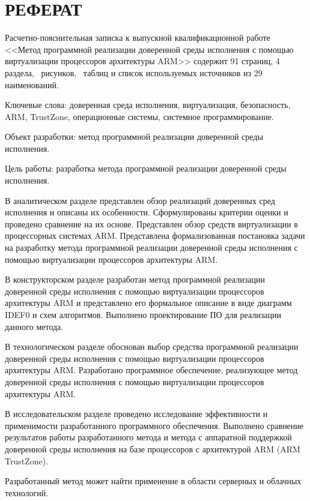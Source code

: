 \section*{РЕФЕРАТ}

Расчетно-пояснительная записка к выпускной квалификационной работе <<Метод программной реализации доверенной среды исполнения с помощью виртуализации процессоров архитектуры ARM>> содержит 91 страниц, 4 раздела, \totalfigures\ рисунков, \totaltables\ таблиц и список используемых источников из 29 наименований.

Ключевые слова: доверенная среда исполнения, виртуализация, безопасность, ARM, TrustZone, операционные системы, системное программирование.

Объект разработки: метод программной реализации доверенной среды исполнения.

Цель работы: разработка метода программной реализации доверенной среды исполнения.
 
В аналитическом разделе представлен обзор реализаций доверенных сред исполнения и описаны их особенности. Сформулированы критерии оценки и проведено сравнение на их основе. Представлен обзор средств виртуализации в процессорных системах ARM. Представлена формализованная постановка задачи на разработку метода программной реализации доверенной среды исполнения с помощью виртуализации процессоров архитектуры ARM.

В конструкторском разделе разработан метод программной реализации доверенной среды исполнения с помощью виртуализации процессоров архитектуры ARM и представлено его формальное описание в виде диаграмм IDEF0 и схем алгоритмов. Выполнено проектирование ПО для реализации данного метода.

В технологическом разделе обоснован выбор средства программной реализации доверенной среды исполнения с помощью виртуализации процессоров архитектуры ARM. Разработано программное обеспечение, реализующее метод доверенной среды исполнения с помощью виртуализации процессоров архитектуры ARM.

В исследовательском разделе проведено исследование эффективности и применимости разработанного программного обеспечения. Выполнено сравнение результатов работы разработанного метода и метода с аппаратной поддержкой доверенной среды исполнения на базе процессоров с архитектурой ARM (ARM TrustZone).

Разработанный метод может найти применение в области серверных и облачных технологий.

\pagebreak
